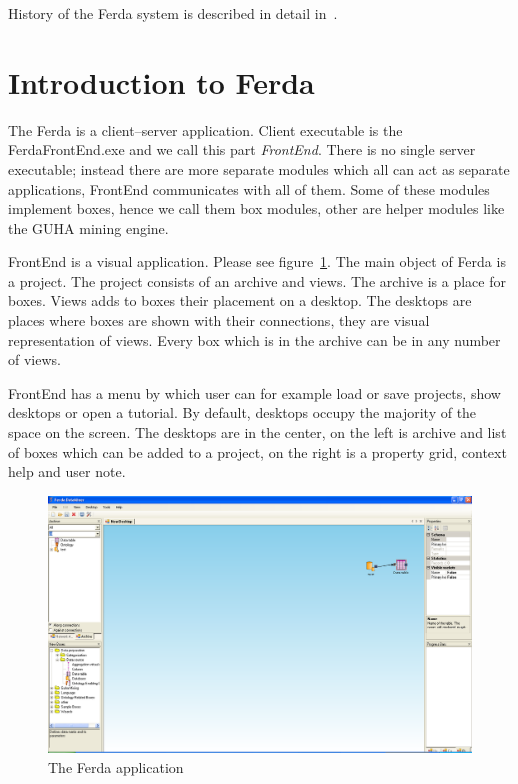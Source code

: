 \documentclass[a4paper,12pt]{book}
\begin{document}
History of the Ferda system is described in detail in~\cite{RalbovskyHistory}.

\section{Introduction to Ferda}
The Ferda is a client--server application. Client executable is the FerdaFrontEnd.exe and we call this part \emph{FrontEnd}. There is no single server executable; instead there are more separate modules which all can act as separate applications, FrontEnd communicates with all of them. Some of these modules implement boxes, hence we call them box modules, other are helper modules like the GUHA mining engine.

FrontEnd is a visual application. Please see figure~\ref{fig:ferda}. The main object of Ferda is a project. The project consists of an archive and views. The archive is a place for boxes. Views adds to boxes their placement on a desktop. The desktops are places where boxes are shown with their connections, they are visual representation of views. Every box which is in the archive can be in any number of views.

FrontEnd has a menu by which user can for example load or save projects, show desktops or open a tutorial. By default, desktops occupy the majority of the space on the screen. The desktops are in the center, on the left is archive and list of boxes which can be added to a project, on the right is a property grid, context help and user note.
 
\begin{figure}
	\noindent\includegraphics[width=1\textwidth]{ferda}
	\caption{The Ferda application}
	\label{fig:ferda}
\end{figure}
\end{document}
